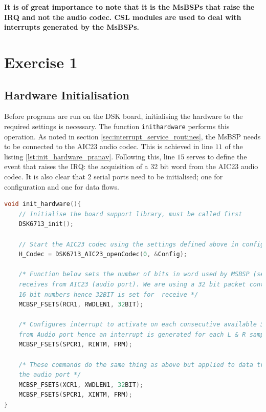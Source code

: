 \documentclass{article}
\begin{document}
\textbf{It is of great importance to note that it is the MsBSPs that raise the IRQ and not the audio codec. CSL modules are used to deal with interrupts generated by the MsBSPs.}\\

\newpage
\section{Exercise 1}

\subsection{Hardware Initialisation}

Before programs are run on the DSK board, initialising the hardware to the required settings is necessary. The function {\tt init\textunderscore hardware} performs this operation. As noted in section \ref{sec:interrupt_service_routines}, the MsBSP needs to be connected to the AIC23 audio codec. This is achieved in line $11$ of the listing \ref{lst:init_hardware_pranav}. Following this, line $15$ serves to define the event that raises the IRQ: the acquisition of a 32 bit word from the AIC23 audio codec. It is also clear that 2 serial ports need to be initialised; one for configuration and one for data flows.\\

\begin{lstlisting}[language=C, frame=single, caption=Hardware Initialisation Settings, label = lst:init_hardware_pranav]
void init_hardware(){
    // Initialise the board support library, must be called first 
    DSK6713_init();

    // Start the AIC23 codec using the settings defined above in config 
    H_Codec = DSK6713_AIC23_openCodec(0, &Config);

    /* Function below sets the number of bits in word used by MSBSP (serial port) for 
    receives from AIC23 (audio port). We are using a 32 bit packet containing two 
    16 bit numbers hence 32BIT is set for  receive */
    MCBSP_FSETS(RCR1, RWDLEN1, 32BIT);	

    /* Configures interrupt to activate on each consecutive available 32 bits 
    from Audio port hence an interrupt is generated for each L & R sample pair */	
    MCBSP_FSETS(SPCR1, RINTM, FRM);

    /* These commands do the same thing as above but applied to data transfers to  
    the audio port */
    MCBSP_FSETS(XCR1, XWDLEN1, 32BIT);	
    MCBSP_FSETS(SPCR1, XINTM, FRM);	
}
\end{lstlisting}
\end{document}
